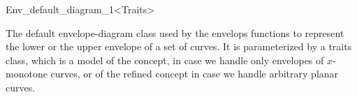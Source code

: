 
\ccRefPageBegin

\begin{ccRefClass}{Env_default_diagram_1<Traits>}

\ccDefinition

The default envelope-diagram class used by the envelops functions to represent
the lower or the upper envelope of a set of curves. It is parameterized by a
traits class, which is a model of the 
concept, in case we handle only envelopes of $x$-monotone curves, or of the
refined  concept in case we handle arbitrary planar
curves.


\ccIsModel

\end{ccRefClass}

\ccRefPageEnd
